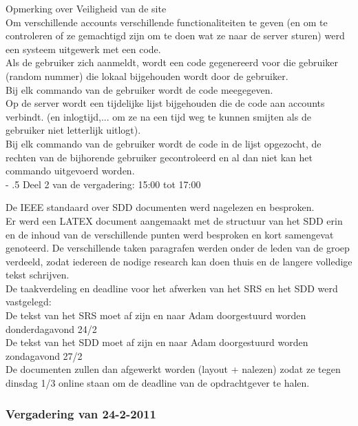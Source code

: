\documentclass{article}
\makeatletter
\renewcommand\paragraph{%
   \@startsection{paragraph}{4}{0mm}%
      {-\baselineskip}%
      {.5\baselineskip}%
      {\normalfont\normalsize\bfseries}}
\makeatother
\begin{document}
Opmerking over Veiligheid van de site \\
Om verschillende accounts verschillende functionaliteiten te geven (en om te controleren of ze gemachtigd zijn om te doen wat ze naar de server sturen) werd een systeem uitgewerk met een code. \\
Als de gebruiker zich aanmeldt, wordt een code gegenereerd voor die gebruiker (random nummer) die lokaal bijgehouden wordt door de gebruiker. \\
Bij elk commando van de gebruiker wordt de code meegegeven. \\
Op de server wordt een tijdelijke lijst bijgehouden die de code aan accounts verbindt. (en inlogtijd,... om ze na een tijd weg te kunnen smijten als de gebruiker niet letterlijk uitlogt). \\
Bij elk commando van de gebruiker wordt de code in de lijst opgezocht, de rechten van de bijhorende gebruiker gecontroleerd en al dan niet kan het commando uitgevoerd worden. \\

\paragraph{Deel 2 van de vergadering: 15:00 tot 17:00}

De IEEE standaard over SDD documenten werd nagelezen en besproken. \\
Er werd een LATEX document aangemaakt met de structuur van het SDD erin en de inhoud van de verschillende punten werd besproken en kort samengevat genoteerd. 
De verschillende taken paragrafen werden onder de leden van de groep verdeeld, zodat iedereen de nodige research kan doen thuis en de langere volledige tekst schrijven. \\[3mm]

De taakverdeling en deadline voor het afwerken van het SRS en het SDD werd vastgelegd: \\
De tekst van het SRS moet af zijn en naar Adam doorgestuurd worden donderdagavond 24/2 \\
De tekst van het SDD moet af zijn en naar Adam doorgestuurd worden zondagavond 27/2 \\[3mm]

De documenten zullen dan afgewerkt worden (layout + nalezen) zodat ze tegen dinsdag 1/3 online staan om de deadline van de opdrachtgever te halen.

\newpage
\subsubsection{Vergadering van 24-2-2011}
\end{document}
